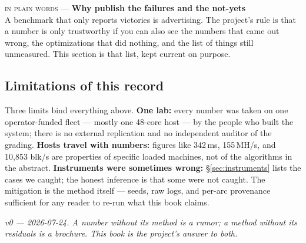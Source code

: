 \documentclass[10pt,a4paper]{article}
\newcommand{\layman}[3]{%
\begin{tcolorbox}[enhanced,
  interior style={left color=#1!9,right color=white},
  colframe=#1!45!slate,boxrule=0.5pt,arc=3pt,
  borderline west={2.5pt}{0pt}{#1},
  left=9pt,right=9pt,top=7pt,bottom=7pt]
{\scriptsize\textcolor{#1}{\textsc{in plain words}}\; — \;\textbf{\small #2}}\\[3pt]
\small #3
\end{tcolorbox}}
\begin{document}
\layman{sigilamber}{Why publish the failures and the not-yets}{
A benchmark that only reports victories is advertising. The project's rule is that a
number is only trustworthy if you can also see the numbers that came out wrong, the
optimizations that did nothing, and the list of things still unmeasured. This section is
that list, kept current on purpose.}

\subsection{Limitations of this record}

\noindent Three limits bind everything above. \textbf{One lab:} every number was taken on
one operator-funded fleet --- mostly one 48-core host --- by the people who built the
system; there is no external replication and no independent auditor of the grading.
\textbf{Hosts travel with numbers:} figures like 342\,ms, 155\,MH/s, and 10{,}853 blk/s
are properties of specific loaded machines, not of the algorithms in the abstract.
\textbf{Instruments were sometimes wrong:} \S\ref{sec:instruments} lists the cases we
caught; the honest inference is that some were not caught. The mitigation is the method
itself --- seeds, raw logs, and per-arc provenance sufficient for any reader to re-run
what this book claims.

\vspace{10pt}
\noindent\textit{v0 --- 2026-07-24. A number without its method is a rumor; a method
without its residuals is a brochure. This book is the project's answer to both.}

\end{document}
